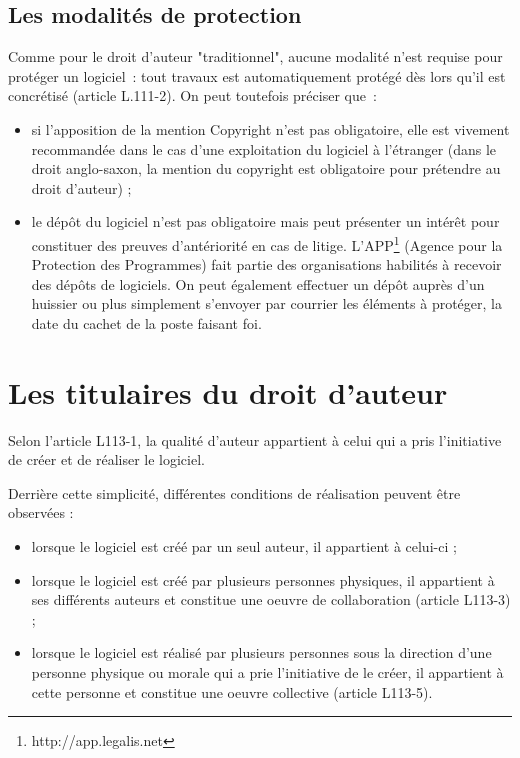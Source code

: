 \documentclass[pdftex,a4paper,11pt]{report}
\begin{document}
\subsection{Les modalités de protection}
Comme pour le droit d'auteur "traditionnel", aucune modalité n'est requise pour protéger un logiciel~: tout travaux est automatiquement protégé dès lors qu'il est concrétisé (article L.111-2). On peut toutefois préciser que~:
\begin{itemize}
\item si l'apposition de la mention Copyright n'est pas obligatoire, elle est vivement recommandée dans le cas d'une exploitation du logiciel à l'étranger (dans le droit anglo-saxon, la mention du copyright est obligatoire pour prétendre au droit d'auteur) ;
\item le dépôt du logiciel n'est pas obligatoire mais peut présenter un intérêt pour constituer des preuves d'antériorité en cas de litige. L'APP\footnote{http://app.legalis.net} (Agence pour la Protection des Programmes) fait partie des organisations habilités à recevoir des dépôts de logiciels. On peut également effectuer un dépôt auprès d'un huissier ou plus simplement s'envoyer par courrier les éléments à protéger, la date du cachet de la poste faisant foi.
\end{itemize}

\section{Les titulaires du droit d'auteur}
Selon l'article L113-1, la qualité d'auteur appartient à celui qui a pris l'initiative de créer et de réaliser le logiciel.

Derrière cette simplicité, différentes conditions de réalisation peuvent être observées :
\begin{itemize}
\item lorsque le logiciel est créé par un seul auteur, il appartient à celui-ci ;
\item lorsque le logiciel est créé par plusieurs personnes physiques, il appartient à ses différents auteurs et constitue une oeuvre de collaboration (article L113-3) ;
\item lorsque le logiciel est réalisé par plusieurs personnes sous la direction d'une personne physique ou morale qui a prie l'initiative de le créer, il appartient à cette personne et constitue une oeuvre collective (article L113-5).
\end{itemize}
\end{document}
